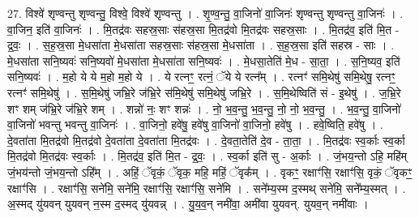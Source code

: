 \documentclass[17pt]{extarticle}
\begin{document}
27. विश्वे॑ शृण्वन्तु शृण्वन्तु॒ विश्वे॒ विश्वे॑ शृण्वन्तु । . शृ॒ण्व॒न्तु॒ वा॒जिनो॑ वा॒जिनः॑ शृण्वन्तु शृण्वन्तु वा॒जिनः॑ । . वा॒जिन॒ इति॑ वा॒जिनः॑ । . मि॒तद्र॑वः सहस्र॒साः स॑हस्र॒सा मि॒तद्र॑वो मि॒तद्र॑वः सहस्र॒साः । . मि॒तद्र॑व॒ इति॑ मि॒त - द्र॒वः॒ । . स॒ह॒स्र॒सा मे॒धसा॑ता मे॒धसा॑ता सहस्र॒साः स॑हस्र॒सा मे॒धसा॑ता । . स॒ह॒स्र॒सा इति॑ सहस्र - साः । . मे॒धसा॑ता सनि॒ष्यवः॑ सनि॒ष्यवो॑ मे॒धसा॑ता मे॒धसा॑ता सनि॒ष्यवः॑ । . मे॒धसा॒तेति॑ मे॒ध - सा॒ता॒ । . स॒नि॒ष्यव॒ इति॑ सनि॒ष्यवः॑ । . म॒हो ये ये म॒हो म॒हो ये । . ये रत्नꣳ॒॒ रत्नं॒ ॅये ये रत्न᳚म् । . रत्नꣳ॑ समि॒थेषु॑ समि॒थेषु॒ रत्नꣳ॒॒ रत्नꣳ॑ समि॒थेषु॑ । . स॒मि॒थेषु॑ जभ्रि॒रे ज॑भ्रि॒रे स॑मि॒थेषु॑ समि॒थेषु॑ जभ्रि॒रे । . स॒मि॒थेष्विति॑ सं - इ॒थेषु॑ । . ज॒भ्रि॒रे शꣳ शम् ज॑भ्रि॒रे ज॑भ्रि॒रे शम् । . शन्नो॑ नः॒ शꣳ शन्नः॑ । . नो॒ भ॒व॒न्तु॒ भ॒व॒न्तु॒ नो॒ नो॒ भ॒व॒न्तु॒ । . भ॒व॒न्तु॒ वा॒जिनो॑ वा॒जिनो॑ भवन्तु भवन्तु वा॒जिनः॑ । . वा॒जिनो॒ हवे॑षु॒ हवे॑षु वा॒जिनो॑ वा॒जिनो॒ हवे॑षु । . हवे॒ष्विति॒ हवे॑षु । . दे॒वता॑ता मि॒तद्र॑वो मि॒तद्र॑वो दे॒वता॑ता दे॒वता॑ता मि॒तद्र॑वः । . दे॒वता॒तेति॑ दे॒व - ता॒ता॒ । . मि॒तद्र॑वः स्व॒र्काः स्व॒र्का मि॒तद्र॑वो मि॒तद्र॑वः स्व॒र्काः । . मि॒तद्र॑व॒ इति॑ मि॒त - द्र॒वः॒ । . स्व॒र्का इति॑ सु - अ॒र्काः । . जं॒भय॒न्तो ऽहि॒ महि॑म् जं॒भय॑न्तो जं॒भय॒न्तो ऽहि᳚म् । . अहिं॒ ॅवृकं॒ ॅवृक॒ महि॒ महिं॒ ॅवृक᳚म् । . वृकꣳ॒॒ रक्षाꣳ॑सि॒ रक्षाꣳ॑सि॒ वृकं॒ ॅवृकꣳ॒॒ रक्षाꣳ॑सि । . रक्षाꣳ॑सि॒ सने॑मि॒ सने॑मि॒ रक्षाꣳ॑सि॒ रक्षाꣳ॑सि॒ सने॑मि । . सने᳚म्य॒स्म द॒स्मथ् सने॑मि॒ सने᳚म्य॒स्मत् । . अ॒स्मद् यु॑यवन् युयवन् न॒स्म द॒स्मद् यु॑यवन्न् । . यु॒य॒व॒न् नमी॑वा॒ अमी॑वा युयवन्. युयव॒न् नमी॑वाः । \newline
\end{document}
